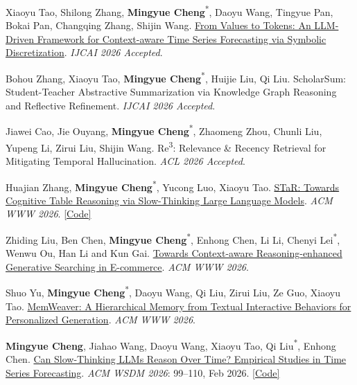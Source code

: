 \documentclass[UTF8,fontset=fandol,scheme=plain,11pt,a4paper]{ctexart}
\newcommand{\pubentry}[1]{\item \begin{minipage}[t]{\linewidth}#1\end{minipage}}
\begin{document}
\begin{publist}[start=4]
\pubentry{Xiaoyu Tao, Shilong Zhang, \textbf{Mingyue Cheng}\textsuperscript{*}, Daoyu Wang, Tingyue Pan, Bokai Pan, Changqing Zhang, Shijin Wang. \href{https://arxiv.org/pdf/2508.09191}{From Values to Tokens: An LLM-Driven Framework for Context-aware Time Series Forecasting via Symbolic Discretization}. \emph{IJCAI 2026 Accepted}.}

\pubentry{Bohou Zhang, Xiaoyu Tao, \textbf{Mingyue Cheng}\textsuperscript{*}, Huijie Liu, Qi Liu. ScholarSum: Student-Teacher Abstractive Summarization via Knowledge Graph Reasoning and Reflective Refinement. \emph{IJCAI 2026 Accepted}.}

\pubentry{Jiawei Cao, Jie Ouyang, \textbf{Mingyue Cheng}\textsuperscript{*}, Zhaomeng Zhou, Chunli Liu, Yupeng Li, Zirui Liu, Shijin Wang. Re\textsuperscript{3}: Relevance \& Recency Retrieval for Mitigating Temporal Hallucination. \emph{ACL 2026 Accepted}.}

\pubentry{Huajian Zhang, \textbf{Mingyue Cheng}\textsuperscript{*}, Yucong Luo, Xiaoyu Tao. \href{https://arxiv.org/pdf/2511.11233}{STaR: Towards Cognitive Table Reasoning via Slow-Thinking Large Language Models}. \emph{ACM WWW 2026}. \href{https://github.com/zhjai/STaR}{[Code]}}

\pubentry{Zhiding Liu, Ben Chen, \textbf{Mingyue Cheng}\textsuperscript{*}, Enhong Chen, Li Li, Chenyi Lei\textsuperscript{*}, Wenwu Ou, Han Li and Kun Gai. \href{https://arxiv.org/abs/2510.16925}{Towards Context-aware Reasoning-enhanced Generative Searching in E-commerce}. \emph{ACM WWW 2026}.}

\pubentry{Shuo Yu, \textbf{Mingyue Cheng}\textsuperscript{*}, Daoyu Wang, Qi Liu, Zirui Liu, Ze Guo, Xiaoyu Tao. \href{https://arxiv.org/abs/2510.07713}{MemWeaver: A Hierarchical Memory from Textual Interactive Behaviors for Personalized Generation}. \emph{ACM WWW 2026}.}

\pubentry{\textbf{Mingyue Cheng}, Jiahao Wang, Daoyu Wang, Xiaoyu Tao, Qi Liu\textsuperscript{*}, Enhong Chen. \href{https://dl.acm.org/doi/10.1145/3773966.3777931}{Can Slow-Thinking LLMs Reason Over Time? Empirical Studies in Time Series Forecasting}. \emph{ACM WSDM 2026}: 99--110, Feb 2026. \href{https://github.com/realwangjiahao/TimeReasoner}{[Code]}}


\end{publist}
\end{document}
